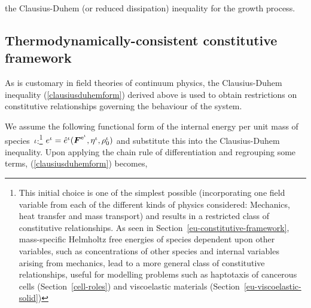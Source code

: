 \noindent the Clausius-Duhem (or reduced dissipation) inequality for
the growth process.

\subsection{Thermodynamically-consistent constitutive framework}
\label{constitutive-framework}

As is customary in field theories of continuum physics, the
Clausius-Duhem inequality (\ref{clausiusduhemform}) derived above is
used to obtain restrictions on constitutive relationships governing
the behaviour of the system.

We assume the following functional form of the internal energy per
unit mass of species~$\iota$:\footnote{This initial choice is one of
  the simplest possible (incorporating one field variable from each of
  the different kinds of physics considered: Mechanics, heat transfer
  and mass transport) and results in a restricted class of
  constitutive relationships. As seen in
  Section~\ref{eu-constitutive-framework}, mass-specific Helmholtz
  free energies of species dependent upon other variables, such as
  concentrations of other species and internal variables arising from
  mechanics, lead to a more general class of constitutive
  relationships, useful for modelling problems such as haptotaxis of
  cancerous cells (Section~\ref{cell-roles}) and viscoelastic
  materials (Section~\ref{eu-viscoelastic-solid})} $e^{\iota} =
\hat{e}^\iota(\mbox{\boldmath$ F$}^{\mathrm{e}^\iota}, \eta^{\iota}, \rho_0^\iota)$ and
substitute this into the Clausius-Duhem inequality. Upon applying the
chain rule of differentiation and regrouping some terms,
(\ref{clausiusduhemform}) becomes,


